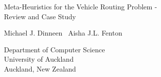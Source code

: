 

\pagestyle{empty}

\LARGE
\begin{flushleft}
Meta-Heuristics for the Vehicle Routing Problem - \\[0.2Cm]
\hspace{1.0cm} Review and Case Study\\[0.2cm]
\end{flushleft}

\normalsize
\begin{flushleft}
Michael J. Dinneen \ Aisha J.L. Fenton
\end{flushleft}

\vfill
\rmfamily
\begin{flushright}
Department of Computer Science\\
University of Auckland \\
Auckland, New Zealand 
\end{flushright}

\cleardoublepage